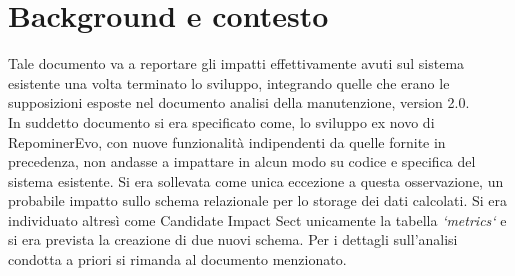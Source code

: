 \chapter{Background e contesto}
Tale documento va a reportare gli impatti effettivamente avuti sul sistema esistente una volta terminato lo sviluppo, integrando quelle che erano le supposizioni esposte nel documento analisi della manutenzione, version 2.0.\\

In suddetto documento si era specificato come, lo sviluppo ex novo di RepominerEvo, con nuove funzionalità indipendenti da quelle fornite in precedenza, non andasse a impattare in alcun modo su codice e specifica del sistema esistente.  Si era sollevata come unica eccezione a questa osservazione, un probabile impatto sullo schema relazionale per lo storage dei dati calcolati. Si era individuato altresì come Candidate Impact Sect unicamente la tabella \textit{`metrics`} e si era prevista la creazione di due nuovi schema. Per i dettagli sull'analisi condotta a priori si rimanda al documento menzionato.